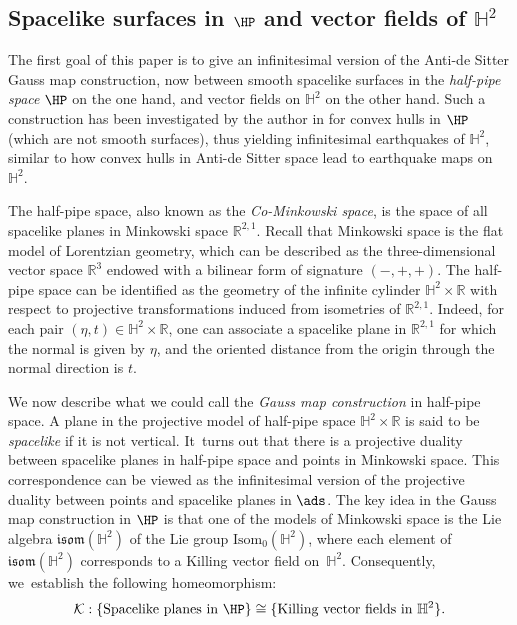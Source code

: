 \subsection{Spacelike surfaces in \texorpdfstring{$\HP$}{HP}
and vector fields of \texorpdfstring{$\mathbb{H}^2$}{H2}}

The first goal of this paper is to give an infinitesimal version of the Anti-de Sitter Gauss map construction, now between smooth spacelike surfaces in the \emph{half-pipe space} \(\HP\) on the one hand, and vector fields on \(\mathbb{H}^2\) on the other hand. Such a construction has been investigated by the author in \cite{diaf2023Infearth} for convex hulls in \(\HP\) (which are not smooth surfaces), thus yielding infinitesimal earthquakes of \(\mathbb{H}^2\), similar to how convex hulls in Anti-de Sitter space lead to earthquake maps on \(\mathbb{H}^2\).

The half-pipe space, also known as the \emph{Co-Minkowski space}, is the space of all spacelike planes in Minkowski space \(\mathbb{R}^{2,1}\). Recall that Minkowski space is the flat model of Lorentzian geometry, which can be described as the three-dimensional vector space \(\mathbb{R}^3\) endowed with a bilinear form of signature \((-,+,+)\). The half-pipe space can be identified as the geometry of the infinite cylinder \(\mathbb{H}^2 \times \mathbb{R}\) with respect to projective transformations induced from isometries of \(\mathbb{R}^{2,1}\). Indeed, for each pair \((\eta,t) \in \mathbb{H}^2 \times \mathbb{R}\), one can associate a spacelike plane in \(\mathbb{R}^{2,1}\) for which the normal is given by \(\eta\), and the oriented distance from the origin through the normal direction is \(t\).

We now describe what we could call the \emph{Gauss map construction} in half-pipe space. A plane in the projective model of half-pipe space \(\mathbb{H}^2 \times \mathbb{R}\) is said to be \emph{spacelike} if it is not vertical. It~turns out that there is a projective duality between spacelike planes in half-pipe space and points in Minkowski space. This correspondence can be viewed as the infinitesimal version of the projective duality between points and spacelike planes in \(\ads\). The key idea in the Gauss map construction in \(\HP\) is that one of the models of Minkowski space is the Lie algebra \(\mathfrak{isom}(\mathbb{H}^2)\) of the Lie group \(\text{Isom}_0(\mathbb{H}^2)\), where each element of \(\mathfrak{isom}(\mathbb{H}^2)\) corresponds to a Killing vector field on~\(\mathbb{H}^2\). Consequently, we~establish the following homeomorphism:
\begin{equation}\label{introduction_duality}
\mathcal{K}: \{\text{Spacelike planes in } \HP\} \cong \{\text{Killing vector fields in } \mathbb{H}^2\}.
\end{equation}

